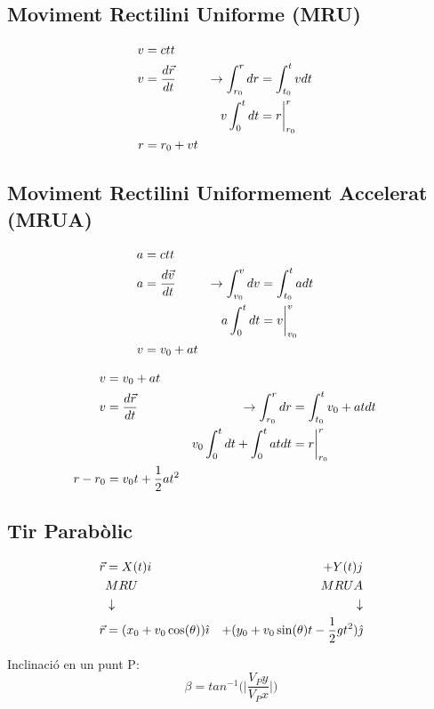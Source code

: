 \subsection{Moviment Rectilini Uniforme (MRU)}
\begin{align}\label{equ:Vel. MRU}
    v &= ctt \notag \\
    v &= \frac{d \vec{r}}{d t} &\rightarrow \int_{r_0}^r dr &= \int_{t_0}^t v  dt \notag \\
    && v \int_0^t dt &= r \bigg |_{r_0}^r \notag\\
    r &= r_0 + vt 
\end{align}

\subsection{Moviment Rectilini Uniformement Accelerat (MRUA)}
\begin{align}\label{equ:Vel. MRUA}
    a &= ctt \notag \\
    a &= \frac{d \vec{v}}{d t} &\rightarrow \int_{v_0}^v dv &= \int_{t_0}^t a  dt \notag \\
    && a \int_0^t dt &= v \bigg |_{v_0}^v \notag\\
    v &= v_0 + at 
\end{align}

\begin{align}\label{equ:Pos. MRUA}
    v &= v_0 + at  \notag \\
    v &= \frac{d \vec{r}}{d t} &\rightarrow \int_{r_0}^r dr &= \int_{t_0}^t v_0 + at  dt \notag \\
    && v_0 \int_0^t dt + \int_0^t atdt &= r \bigg |_{r_0}^r \notag\\
    r - r_0 &= v_0t+\frac{1}{2}at^2 
\end{align}

\subsection{Tir Parabòlic}
\begin{align}\label{Tir Parabolic}
    \vec{r} &= X(t)i & + Y(t)j \notag \\
    & MRU &  MRUA \notag \\
    & \downarrow  & \downarrow \notag \\
    \vec{r} &= (x_0+v_0\cos(\theta)) \hat{\imath} & + (y_0 + v_0\sin(\theta)t - \frac{1}{2}gt^2) \hat{\jmath}
\end{align}

Inclinació en un punt P:
\begin{equation}\label{eqi:Inclinacio tir parabolic}
    \beta = tan^{-1}\bigg(\bigg|\frac{V_Py}{V_Px}\bigg|\bigg)
\end{equation}


